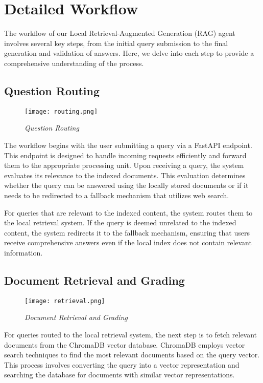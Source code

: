 \section{Detailed Workflow}

The workflow of our Local Retrieval-Augmented Generation (RAG) agent involves several key steps, from the initial query submission to the final generation and validation of answers. Here, we delve into each step to provide a comprehensive understanding of the process.

\subsection{Question Routing}

\begin{figure}[H]
    \centering
    \texttt{[image: routing.png]}
    \caption{
        \it{Question Routing}
    }
\end{figure}

The workflow begins with the user submitting a query via a FastAPI endpoint. This endpoint is designed to handle incoming requests efficiently and forward them to the appropriate processing unit. Upon receiving a query, the system evaluates its relevance to the indexed documents. This evaluation determines whether the query can be answered using the locally stored documents or if it needs to be redirected to a fallback mechanism that utilizes web search.

For queries that are relevant to the indexed content, the system routes them to the local retrieval system. If the query is deemed unrelated to the indexed content, the system redirects it to the fallback mechanism, ensuring that users receive comprehensive answers even if the local index does not contain relevant information.

\subsection{Document Retrieval and Grading}

\begin{figure}[H]
    \centering
    \texttt{[image: retrieval.png]}
    \caption{
        \it{Document Retrieval and Grading}
    }
\end{figure}

For queries routed to the local retrieval system, the next step is to fetch relevant documents from the ChromaDB vector database. ChromaDB employs vector search techniques to find the most relevant documents based on the query vector. This process involves converting the query into a vector representation and searching the database for documents with similar vector representations.

